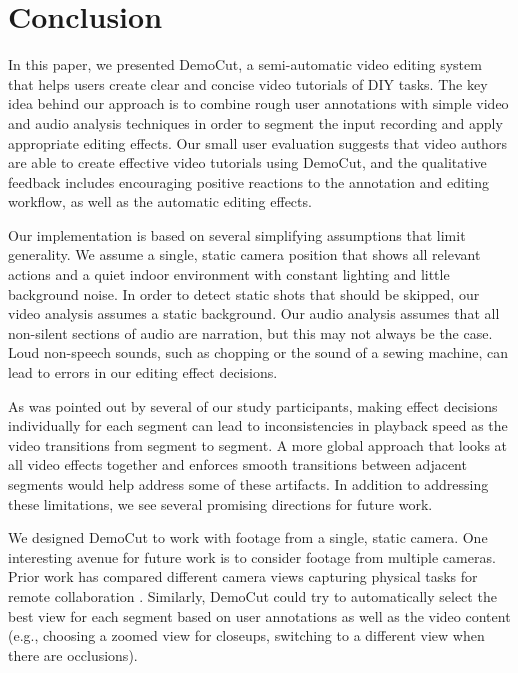\section{Conclusion}

In this paper, we presented DemoCut, a semi-automatic video editing
system that helps users create clear and concise video tutorials of
DIY tasks. The key idea behind our approach is to combine rough user
annotations with simple video and audio analysis techniques in order
to segment the input recording and apply appropriate editing
effects. Our small user evaluation suggests that video authors are
able to create effective video tutorials using DemoCut, and the
qualitative feedback includes encouraging positive reactions to the
annotation and editing workflow, as well as the automatic editing
effects.


Our implementation is based on several simplifying assumptions that
limit generality. We assume a single, static camera position that
shows all relevant actions and a quiet indoor environment with
constant lighting and little background noise. In order to detect static shots  that should be skipped, our video analysis assumes a static background. Our audio analysis assumes that all non-silent sections of audio are narration, but this may not always be the case. Loud non-speech sounds, such as chopping or the sound of a sewing machine, can lead to errors in our editing effect decisions.

As was pointed out by several of our study participants, making effect decisions individually for each segment can lead to inconsistencies in playback speed as the video transitions from segment to segment. A more global approach that looks at all video effects together and enforces  smooth transitions between adjacent segments would help address some of these artifacts.
%
In addition to addressing these limitations, we see several promising
directions for future work.

 We designed DemoCut to work with
footage from a single, static camera. One interesting avenue for
future work is to consider footage from multiple cameras. Prior work has compared different camera views capturing physical
tasks for remote collaboration \cite{Fussell:2003te,Ranjan:2007}. Similarly, DemoCut could try to automatically select the best view for
each segment based on user annotations as well as the video content
(e.g., choosing a zoomed view for closeups, switching to a
different view when there are occlusions). %

